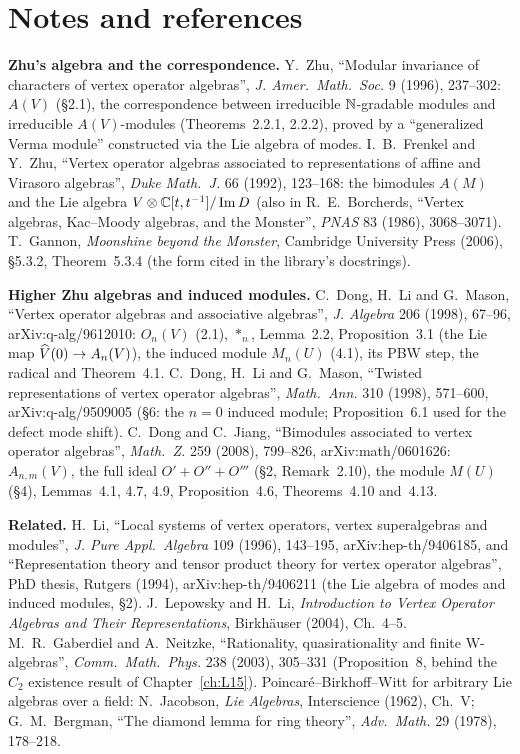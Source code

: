 \section{Notes and references}\label{l13:sec:notes}

\textbf{Zhu's algebra and the correspondence.} Y.~Zhu, ``Modular invariance of characters of vertex operator algebras'',
\emph{J. Amer.\ Math.\ Soc.} 9 (1996), 237--302: $A(V)$ (§2.1), the correspondence between irreducible ${\mathbb{N}}$-gradable modules and
irreducible $A(V)$-modules (Theorems~2.2.1, 2.2.2), proved by a ``generalized Verma module'' constructed via the Lie algebra of modes.
I.~B.~Frenkel and Y.~Zhu, ``Vertex operator algebras associated to representations of affine and Virasoro algebras'',
\emph{Duke Math.\ J.} 66 (1992), 123--168: the bimodules $A(M)$ and the Lie algebra $V\otimes{\mathbb{C}}[t,t^{-1}]/\operatorname{Im}D$ (also in
R.~E.~Borcherds, ``Vertex algebras, Kac--Moody algebras, and the Monster'', \emph{PNAS} 83 (1986), 3068--3071). T.~Gannon,
\emph{Moonshine beyond the Monster}, Cambridge University Press (2006), §5.3.2, Theorem~5.3.4 (the form cited in the library's
docstrings).

\textbf{Higher Zhu algebras and induced modules.} C.~Dong, H.~Li and G.~Mason, ``Vertex operator algebras and associative algebras'',
\emph{J. Algebra} 206 (1998), 67--96, arXiv:q-alg/9612010: $O_n(V)$ (2.1), $*_n$, Lemma~2.2, Proposition~3.1 (the Lie map
$\widehat{V}(0)\to A_n(V)$), the induced module $M_n(U)$ (4.1), its PBW step, the radical and Theorem~4.1. C.~Dong, H.~Li and
G.~Mason, ``Twisted representations of vertex operator algebras'', \emph{Math.\ Ann.} 310 (1998), 571--600, arXiv:q-alg/9509005
(§6: the $n=0$ induced module; Proposition~6.1 used for the defect mode shift). C.~Dong and C.~Jiang, ``Bimodules associated to vertex
operator algebras'', \emph{Math.\ Z.} 259 (2008), 799--826, arXiv:math/0601626: $A_{n,m}(V)$, the full ideal $O'+O''+O'''$
(§2, Remark~2.10), the module $M(U)$ (§4), Lemmas~4.1, 4.7, 4.9, Proposition~4.6, Theorems~4.10 and~4.13.

\textbf{Related.} H.~Li, ``Local systems of vertex operators, vertex superalgebras and modules'', \emph{J. Pure Appl.\ Algebra} 109 (1996),
143--195, arXiv:hep-th/9406185, and ``Representation theory and tensor product theory for vertex operator algebras'', PhD thesis,
Rutgers (1994), arXiv:hep-th/9406211 (the Lie algebra of modes and induced modules, §2). J.~Lepowsky and H.~Li, \emph{Introduction to
Vertex Operator Algebras and Their Representations}, Birkh\"auser (2004), Ch.~4--5. M.~R.~Gaberdiel and A.~Neitzke, ``Rationality,
quasirationality and finite W-algebras'', \emph{Comm.\ Math.\ Phys.} 238 (2003), 305--331 (Proposition~8, behind the $C_2$ existence
result of Chapter~\ref{ch:L15}). Poincar\'e--Birkhoff--Witt for arbitrary Lie algebras over a field: N.~Jacobson, \emph{Lie Algebras},
Interscience (1962), Ch.~V; G.~M.~Bergman, ``The diamond lemma for ring theory'', \emph{Adv.\ Math.} 29 (1978), 178--218.

